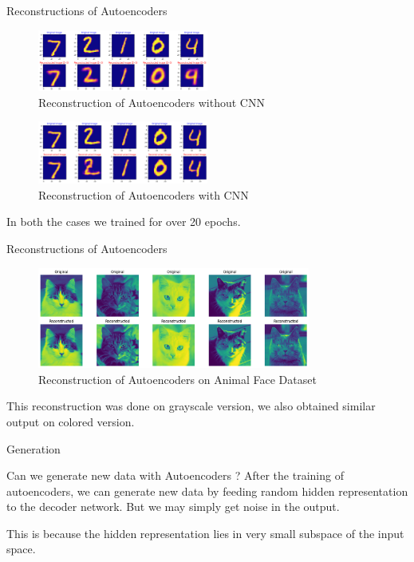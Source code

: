\begin{frame}{Reconstructions of Autoencoders}
    \begin{figure}
        \centering
        \includegraphics[width=0.5\textwidth]{../ReportNeurips/autoencoder1.png}
        \caption{Reconstruction of Autoencoders without CNN}
    \end{figure}

    \begin{figure}
        \centering
        \includegraphics[width=0.5\textwidth]{../ReportNeurips/autoencoder2.png}
        \caption{Reconstruction of Autoencoders with CNN}
    \end{figure}

    In both the cases we trained for over 20 epochs.
\end{frame}

\begin{frame}{Reconstructions of Autoencoders}
    \begin{figure}
        \centering
        \includegraphics[width=0.8\textwidth]{../ReportNeurips/animalFaceAE1.png}
        \caption{Reconstruction of Autoencoders on Animal Face Dataset}
    \end{figure}
    This reconstruction was done on grayscale version, we also obtained similar output on colored version.
\end{frame}
\begin{frame}{Generation}
    \begin{block}{Can we generate new data with Autoencoders ?}
        After the training of autoencoders, we can generate new data by feeding random hidden representation to the decoder network. But we may simply get noise in the output.
    \end{block}
    This is because the hidden representation lies in very small subspace of the input space.
\end{frame}

